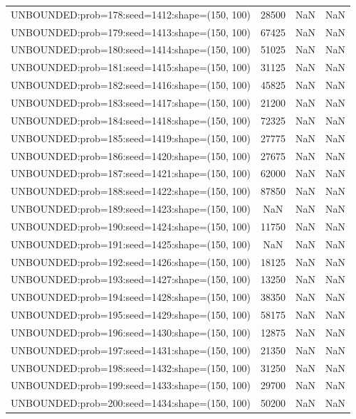 \begin{longtable}{lccc}
UNBOUNDED:prob=178:seed=1412:shape=(150, 100) & 28500 &   NaN &    NaN \\
UNBOUNDED:prob=179:seed=1413:shape=(150, 100) & 67425 &   NaN &    NaN \\
UNBOUNDED:prob=180:seed=1414:shape=(150, 100) & 51025 &   NaN &    NaN \\
UNBOUNDED:prob=181:seed=1415:shape=(150, 100) & 31125 &   NaN &    NaN \\
UNBOUNDED:prob=182:seed=1416:shape=(150, 100) & 45825 &   NaN &    NaN \\
UNBOUNDED:prob=183:seed=1417:shape=(150, 100) & 21200 &   NaN &    NaN \\
UNBOUNDED:prob=184:seed=1418:shape=(150, 100) & 72325 &   NaN &    NaN \\
UNBOUNDED:prob=185:seed=1419:shape=(150, 100) & 27775 &   NaN &    NaN \\
UNBOUNDED:prob=186:seed=1420:shape=(150, 100) & 27675 &   NaN &    NaN \\
UNBOUNDED:prob=187:seed=1421:shape=(150, 100) & 62000 &   NaN &    NaN \\
UNBOUNDED:prob=188:seed=1422:shape=(150, 100) & 87850 &   NaN &    NaN \\
UNBOUNDED:prob=189:seed=1423:shape=(150, 100) &   NaN &   NaN &    NaN \\
UNBOUNDED:prob=190:seed=1424:shape=(150, 100) & 11750 &   NaN &    NaN \\
UNBOUNDED:prob=191:seed=1425:shape=(150, 100) &   NaN &   NaN &    NaN \\
UNBOUNDED:prob=192:seed=1426:shape=(150, 100) & 18125 &   NaN &    NaN \\
UNBOUNDED:prob=193:seed=1427:shape=(150, 100) & 13250 &   NaN &    NaN \\
UNBOUNDED:prob=194:seed=1428:shape=(150, 100) & 38350 &   NaN &    NaN \\
UNBOUNDED:prob=195:seed=1429:shape=(150, 100) & 58175 &   NaN &    NaN \\
UNBOUNDED:prob=196:seed=1430:shape=(150, 100) & 12875 &   NaN &    NaN \\
UNBOUNDED:prob=197:seed=1431:shape=(150, 100) & 21350 &   NaN &    NaN \\
UNBOUNDED:prob=198:seed=1432:shape=(150, 100) & 31250 &   NaN &    NaN \\
UNBOUNDED:prob=199:seed=1433:shape=(150, 100) & 29700 &   NaN &    NaN \\
UNBOUNDED:prob=200:seed=1434:shape=(150, 100) & 50200 &   NaN &    NaN \\

\end{longtable}

